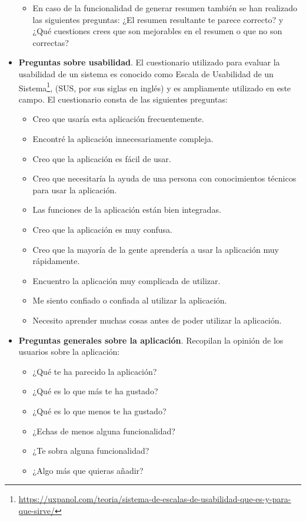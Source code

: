 \begin{itemize}
\begin{itemize}
              \item En caso de la funcionalidad de generar resumen también se han realizado las siguientes preguntas: ¿El resumen resultante te parece correcto? y ¿Qué cuestiones crees que son mejorables en el resumen o que no son correctas?
          \end{itemize}
    \item \textbf{Preguntas sobre usabilidad}. El cuestionario utilizado para evaluar la usabilidad de un sistema es conocido como Escala de Usabilidad de un Sistema\footnote{\url{https://uxpanol.com/teoria/sistema-de-escalas-de-usabilidad-que-es-y-para-que-sirve/}}, (SUS, por sus siglas en inglés) y es ampliamente utilizado en este campo. El cuestionario consta de las siguientes preguntas:
          \begin{itemize}
              \item Creo que usaría esta aplicación frecuentemente.
              \item Encontré la aplicación innecesariamente compleja.
              \item Creo que la aplicación es fácil de usar.
              \item Creo que necesitaría la ayuda de una persona con conocimientos técnicos para usar la aplicación.
              \item Las funciones de la aplicación están bien integradas.
              \item Creo que la aplicación es muy confusa.
              \item Creo que la mayoría de la gente aprendería a usar la aplicación muy rápidamente.
              \item Encuentro la aplicación muy complicada de utilizar.
              \item Me siento confiado o confiada al utilizar la aplicación.
              \item Necesito aprender muchas cosas antes de poder utilizar la aplicación.
          \end{itemize}
    \item \textbf{Preguntas generales sobre la aplicación}. Recopilan la opinión de los usuarios sobre la aplicación:
          \begin{itemize}
              \item ¿Qué te ha parecido la aplicación?
              \item ¿Qué es lo que más te ha gustado?
              \item ¿Qué es lo que menos te ha gustado?
              \item ¿Echas de menos alguna funcionalidad?
              \item ¿Te sobra alguna funcionalidad?
              \item ¿Algo más que quieras añadir?
          \end{itemize}
\end{itemize}

